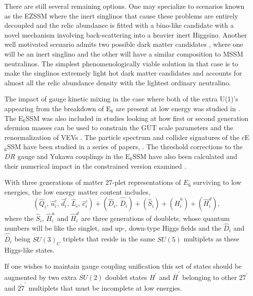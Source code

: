 \documentclass[preprint,amsmath,amssymb,aps,superscriptaddress,prd,showpacs,floatfix,nofootinbib]{revtex4-1}
\newcommand{\be}{\begin{equation}}
\newcommand{\ee}{\end{equation}}
\begin{document}
There are still several remaining options. One may specialize to
scenarios known as the EZSSM \cite{Hall:2011zq} where the inert
singlinos that cause these problems are entirely decoupled and the
relic abundance is fitted with a bino-like candidate with a novel
mechanism involving back-scattering into a heavier inert
Higgsino. Another well motivated scenario admits two possible dark
matter candidates \cite{Nevzorov:2012hs}, where one will be an inert
singlino and the other will have a similar composition to MSSM
neutralinos. The simplest phenomenologically viable solution in that
case is to make the singlinos extremely light hot dark matter
candidates and accounts for almost all the relic abundance density with
the lightest ordinary neutralino.

The impact of gauge kinetic mixing in the case where both of the extra
U(1)'s appearing from the breakdown of E$_6$ are present at low energy
was studied in \cite{Rizzo:2012rf}.  The E$_6$SSM was also included in
studies looking at how first or second generation sfermion masses
can be used to constrain the GUT scale parameters \cite{Miller:2012vn}
and the renormalization of VEVs \cite{Sperling:2013eva,
  Sperling:2013xqa}.  The particle spectrum and collider signatures of
the cE$_6$SSM have been studied in a series of
papers,
\cite{Athron:2009ue,Athron:2009bs,Athron:2011wu,Athron:2012sq}. The
threshold corrections to the $\overline{DR}$ gauge and Yukawa
couplings in the E$_6$SSM have also been calculated and their numerical impact in
the constrained version examined \cite{Athron:2012pw}.


With three generations of matter $27$-plet representations of $E_6$
surviving to low energies, the low energy matter content includes, \be
(\hat{Q}_i,\,\hat{u}^c_i,\,\hat{d}^c_i,\,\hat{L}_i,\,\hat{e}^c_i)
+(\hat{D}_i,\,\hat{\overline{D}}_i)+(\hat{S}_{i})+(\hat{H}^u_i)+(\hat{H}^d_i),\ee
where the $\hat{S}_{i}$, $\hat{H}^u_i$ and $\hat{H}^d_i$ are three
generations of doublets, whose quantum numbers will be like the
singlet, and up-, down-type Higgs fields and the $\hat{D}_i$ and
$\hat{\overline{D}}_i$ being $SU(3)_C$ triplets that reside in the
same $SU(5)$ multiplets as these Higgs-like states.

If one wishes to maintain gauge coupling unification this set of
states should be augmented by two extra $SU(2)$ doublet states
$H^\prime$ and $\overline{H}^\prime$ belonging to other $27^\prime$
and $\overline{27}^\prime$ multiplets that must be incomplete at low
energies.
\end{document}
